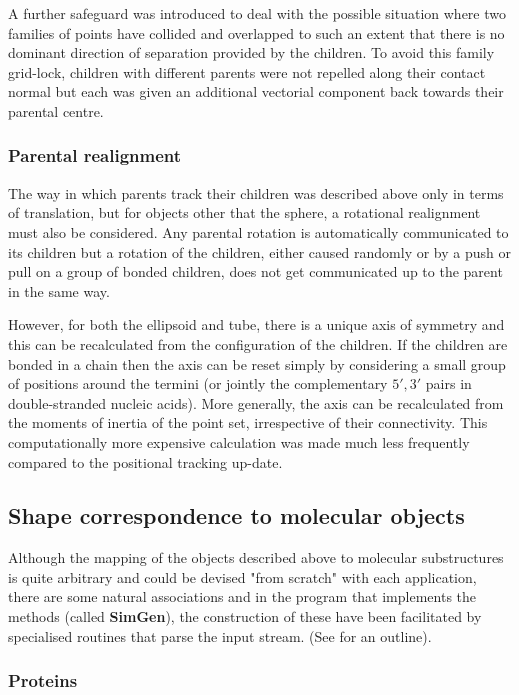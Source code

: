\documentclass[review]{elsarticle}
\newcommand{\TT}[1]{{\ttfamily\bfseries #1}}
\newcommand{\NAME}{{\TT{SimGen}}}
\begin{document}
A further safeguard was introduced to deal with the possible situation where two
families of points have collided and overlapped to such an extent that there is no
dominant direction of separation provided by the children.   To avoid this family
grid-lock, children with different parents were not repelled along their contact
normal but each was given an additional vectorial component back towards their
parental centre.

\subsubsection{Parental realignment}

The way in which parents track their children was described above only in terms of
translation, but for objects other that the sphere, a rotational realignment must also
be considered.   Any parental rotation is automatically communicated to its children but
a rotation of the children, either caused randomly or by a push or pull on a group of
bonded children, does not get communicated up to the parent in the same way.

However, for both the ellipsoid and tube, there is a unique axis of symmetry and this can
be recalculated from the configuration of the children.  If the children are bonded
in a chain then the axis can be reset simply by considering a small group of positions
around the termini (or jointly the complementary $5',3'$ pairs in double-stranded
nucleic acids).   More generally, the axis can be recalculated from the moments
of inertia of the point set, irrespective of their connectivity.
This computationally more expensive calculation was made much less frequently
compared to the positional tracking up-date. 

\subsection{Shape correspondence to molecular objects}

Although the mapping of the objects described above to molecular substructures is quite
arbitrary and could be devised "from scratch" with each application, there are some
natural associations and in the program that implements the methods (called \NAME),
the construction of these have been facilitated by specialised routines that parse
the input stream. (See \cite{TaylorWRet12c} for an outline).

\subsubsection{Proteins}
\end{document}
